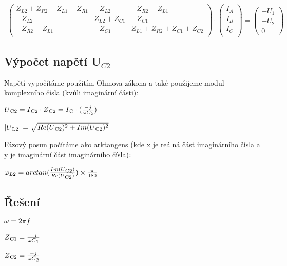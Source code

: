 \begin{align*}
	\begin{pmatrix}
	   Z_{L2}+Z_{R2}+ Z_{L1}+Z_{R1} &-Z_{L2}&-Z_{R2}-Z_{L1}\\
          -Z_{L2}&Z_{L2}+Z_{C1}&-Z_{C1}\\
          -Z_{R2}-Z_{L1}&-Z_{C1}&Z_{L1}+Z_{R2}+ Z_{C1}+Z_{C2}\\
	\end{pmatrix}
	\cdot
	\begin{pmatrix}
		I_{A}\\
            I_{B}\\ 
            I_{C}\\
	\end{pmatrix}
	   =
	\begin{pmatrix}
	   -U_{1}\\ 
          -U_{2}\\ 
          0
	\end{pmatrix}
\end{align*}

\subsection{Výpočet napětí U$_{C2}$}
Napětí vypočítáme použitím Ohmova zákona a také použijeme modul komplexního čísla (kvůli imaginární části)$:\\$

	$U\textsubscript{C2} = I\textsubscript{C2}\cdot Z\textsubscript{C2} = I\textsubscript{C} \cdot (\frac{-j}{\omega C_2} ) \\$
 
	$|U\textsubscript{L2}| = \sqrt{Re(U\textsubscript{C2})^2 + Im(U\textsubscript{C2})^2}\\$

Fázový posun počítáme ako arktangens (kde x je reálná část imaginárního čísla a y je imaginární část imaginárního čísla)$:\\$

	$\varphi_{L2}= arctan(\frac{Im(U\textsubscript{C2})}{Re(U\textsubscript{C2})}) \times \frac{\pi}{180}\\$

\subsection{Řešení}
	
$\omega = 2\pi f \\$

$Z\textsubscript{C1} = \frac{-j}{\omega C\textsubscript{1}}\\$

$Z\textsubscript{C2} = \frac{-j}{\omega C\textsubscript{2}}\\$

